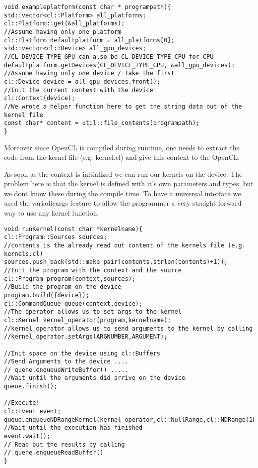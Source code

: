 \label{lst:plat}
\begin{lstlisting}[caption=Get Platforms and devices]
void exampleplatform(const char * programpath){
std::vector<cl::Platform> all_platforms;
cl::Platform::get(&all_platforms);
//Assume having only one platform
cl::Platform defaultplatform = all_platforms[0];
std::vector<cl::Device> all_gpu_devices;
//CL_DEVICE_TYPE_GPU can also be CL_DEVICE_TYPE_CPU for CPU
defaultplatform.getDevices(CL_DEVICE_TYPE_GPU, &all_gpu_devices);
//Assume having only one device / take the first
cl::Device device = all_gpu_devices.front();
//Init the current context with the device
cl::Context(device);
//We wrote a helper function here to get the string data out of the kernel file
const char* content = util::file_contents(programpath);
}
\end{lstlisting}


Moreover since OpenCL is compiled during runtime, one needs to extract the code from the kernel file (e.g. kernel.cl) and give this content to the OpenCL.

As soon as the context is initialized we can run our kernels on the device. The problem here is that the kernel is defined with it's own parameters and types, but we dont know these during the compile time.
To have a universal interface we used the variadicargs feature to allow the programmer a very straight forward way to use any kernel function.
\label{lst:kernel}
\begin{lstlisting}[caption=Kernel usage]
void runKernel(const char *kernelname){
cl::Program::Sources sources;
//contents is the already read out content of the kernels file (e.g. kernels.cl)
sources.push_back(std::make_pair(contents,strlen(contents)+1));
//Init the program with the context and the source
cl::Program program(context,sources);
//Build the program on the device
program.build({device});
cl::CommandQueue queue(context,device);
//The operator allows us to set args to the kernel 
cl::Kernel kernel_operator(program,kernelname);
//kernel_operator allows us to send arguments to the kernel by calling
//kernel_operator.setArgs(ARGNUMBER,ARGUMENT);

//Init space on the device using cl::Buffers
//Send Arguments to the device ....
// quene.enqueueWriteBuffer() .....
//Wait until the arguments did arrive on the device
queue.finish();

//Execute!
cl::Event event;
queue.enqueueNDRangeKernel(kernel_operator,cl::NullRange,cl::NDRange(10),cl::NullRange,NULL,&event);
//Wait until the execution has finished
event.wait();
// Read out the results by calling 
// quene.enqueueReadBuffer()
}
\end{lstlisting}

